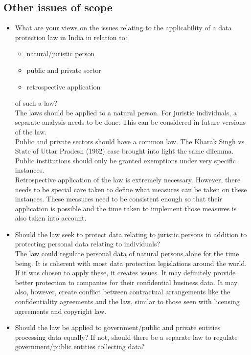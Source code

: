 \subsection{Other issues of scope}
\begin{itemize}
	\item What are your views on the issues relating to the applicability of a data protection law in India in relation to: 
	\begin{itemize}
		\item natural/juristic person 
		\item public and private sector
		\item retrospective application
	\end{itemize} 
	of such a law?
	\\
	The laws should be applied to a natural person. For juristic individuals, a separate analysis needs to be done. This can be considered in future versions of the law. 
	\\
	Public and private sectors should have a common law. The Kharak Singh vs State of Uttar Pradesh (1962) case \cite{kharak} brought into light the same dilemma. Public institutions should only be granted exemptions under very specific instances.
	\\
	Retrospective application of the law is extremely necessary. However, there needs to be special care taken to define what measures can be taken on these instances. These measures need to be consistent enough so that their application is possible and the time taken to implement those measures is also taken into account.
	\item Should the law seek to protect data relating to juristic persons in addition to protecting personal data relating to individuals?
	\\
	The law could regulate personal data of natural persons alone for the time being. It is coherent with most data protection legislations around the world. If it was chosen to apply these, it creates issues. It may definitely provide better protection to companies for their confidential business data. It may also, however, create conflict between contractual arrangements like the confidentiality agreements and the law, similar to those seen with licensing agreements and copyright law.
	\item Should the law be applied to government/public and private entities processing data equally? If not, should there be a separate law to regulate government/public entities collecting data?
	\\

\end{itemize}
